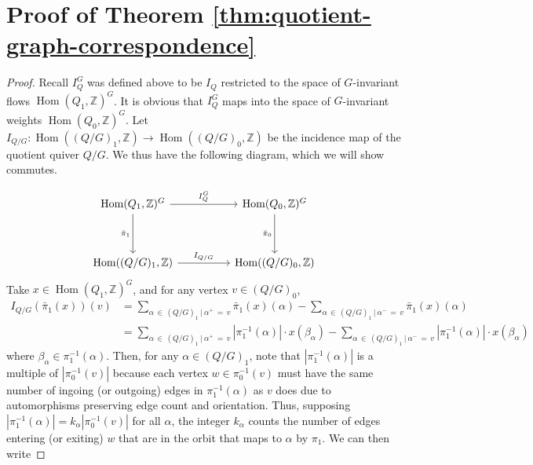 \documentclass[12pt]{amsart}
\theoremstyle{plain}
\theoremstyle{definition}
\newcommand{\Z}{\mathbb{Z}}
\DeclareMathOperator{\Hom}{Hom}
\renewcommand{\hom}{\Hom}
\begin{document}
\section{Proof of Theorem \ref{thm:quotient-graph-correspondence}}
\begin{proof}
    Recall $I_Q^G$ was defined above to be $I_Q$ restricted to the space of $G$-invariant flows $\hom(Q_1, \Z)^G$. It is obvious that $I_Q^G$ maps into the space of $G$-invariant weights $\hom(Q_0, \Z)^G$. Let $I_{Q/G} : \hom((Q/G)_1, \Z) \longrightarrow \hom((Q/G)_0, \Z)$ be the incidence map of the quotient quiver $Q/G$. We thus have the following diagram, which we will show commutes.

\[\begin{tikzcd}
	{\hom(Q_1, \Z)^G} && {\hom(Q_0, \Z)^G} \\
	\\
	{\hom((Q/G)_1, \Z)} && {\hom((Q/G)_0, \Z)}
	\arrow["{I_Q^G}", from=1-1, to=1-3]
	\arrow["{\bar\pi_1}"', from=1-1, to=3-1]
	\arrow["{\bar\pi_0}"', from=1-3, to=3-3]
	\arrow["{I_{Q/G}}", from=3-1, to=3-3]
\end{tikzcd}\]
Take $x \in \hom(Q_1, \Z)^G$, and for any vertex $v \in (Q/G)_0$,
\begin{align*}
    I_{Q/G}(\bar\pi_1(x))(v) &= \sum_{\alpha \,\in\, (Q/G)_1\:|\: \alpha^+ \,=\,v} \bar\pi_1(x)(\alpha) - \sum_{\alpha \,\in\, (Q/G)_1\:|\: \alpha^-\,=\,v} \bar\pi_1(x)(\alpha) \\
    &= \sum_{\alpha \, \in\, (Q/G)_1\:|\: \alpha^+ \,=\,v} |\pi_1^{-1}(\alpha)|\cdot x(\beta_\alpha) - \sum_{\alpha \,\in\, (Q/G)_1\:|\: \alpha^-\,=\,v}  |\pi_1^{-1}(\alpha)|\cdot x(\beta_\alpha)
\end{align*}
where $\beta_\alpha \in \pi_1^{-1}(\alpha)$. Then, for any $\alpha \in (Q/G)_1$, note that $|\pi_1^{-1}(\alpha)|$ is a multiple of $|\pi_0^{-1}(v)|$ because each vertex $w \in \pi_0^{-1}(v)$ must have the same number of ingoing (or outgoing) edges in $\pi_1^{-1}(\alpha)$ as $v$ does due to automorphisms preserving edge count and orientation. Thus, supposing $|\pi_1^{-1}(\alpha)| = k_\alpha|\pi_0^{-1}(v)|$ for all $\alpha$, the integer $k_\alpha$ counts the number of edges entering (or exiting) $w$ that are in the orbit that maps to $\alpha$ by $\pi_1$. We can then write

\end{proof}
\end{document}
